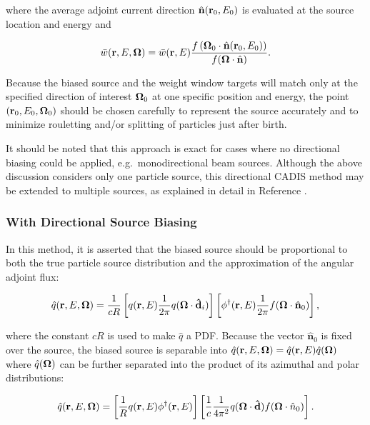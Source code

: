 \noindent where the average adjoint current direction $\hat{\mathbf{n}}(\textbf{r}_0,E_0)$
is evaluated at the source location and energy and

\begin{equation}
\bar{w}(\textbf{r},E,\mathbf\Omega) = \bar{w}(\textbf{r},E)
\frac{f\left(\mathbf\Omega_0\cdot\hat{\mathbf{n}}(\textbf{r}_0,E_0)\right)}
{f(\mathbf\Omega\cdot\hat{\mathbf{n}})}.
\end{equation}

\noindent Because the biased source and the weight window targets will match only at
the specified direction of interest $\mathbf\Omega_0$ at one specific position and energy, the
point $(\textbf{r}_0,E_0,\mathbf\Omega_0)$ should be chosen carefully to represent the source
accurately and to minimize rouletting and/or splitting of particles just after birth.

It should be noted that this approach is exact for cases where no directional biasing
could be applied, e.g.\ monodirectional beam sources. Although the above discussion
considers only one particle source, this directional CADIS method may be extended to
multiple sources, as explained in detail in Reference \cite{peplow}.

\subsubsection{With Directional Source Biasing}

In this method, it is asserted that the biased source should be proportional
to both the true particle source distribution and the approximation of the angular
adjoint flux:

\begin{equation}
\hat{q}(\textbf{r},E,\mathbf\Omega) = \frac{1}{cR}
\left[q(\textbf{r},E)\frac{1}{2\pi}q(\mathbf\Omega\cdot\mathbf{\hat{d}}_i)\right]
\left[\phi^{\dagger}(\textbf{r},E)\frac{1}{2\pi}f(\mathbf\Omega\cdot\hat{\mathbf{n}}_0)\right],
\end{equation}

\noindent where the constant $cR$ is used to make $\hat{q}$ a PDF. Because the vector
$\hat{\mathbf{n}}_0$ is fixed over the source, the biased source is separable into
$\hat{q}(\textbf{r},E,\mathbf\Omega)=\hat{q}(\textbf{r},E)\hat{q}(\mathbf\Omega)$ where $\hat{q}(\mathbf\Omega)$ can be
further separated into the product of its azimuthal and polar distributions:

\begin{equation}
\hat{q}(\textbf{r},E,\mathbf\Omega) = 
\left[\frac{1}{R}q(\textbf{r},E)\phi^{\dagger}(\textbf{r},E)\right]
\left[\frac{1}{c}\frac{1}{4\pi^2}q(\mathbf\Omega\cdot\mathbf{\hat{d}})
f(\mathbf\Omega\cdot\hat{n}_0)\right].
\end{equation}

